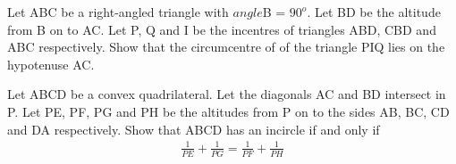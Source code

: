 \item Let ABC be a right-angled triangle with $angle$B = $90^{o}$. Let BD be the altitude from B on to AC. Let P, Q and I be the incentres of triangles ABD, CBD and ABC respectively. Show that the circumcentre of of the triangle PIQ lies on the hypotenuse AC.

\item Let ABCD be a convex quadrilateral. Let the diagonals AC and BD intersect in P. Let PE, PF, PG and PH be the altitudes from P on to the sides AB, BC, CD and DA respectively. Show that ABCD has an incircle if and only if
\begin{align*}
\frac{1}{PE} + \frac{1}{PG} = \frac{1}{PF} + \frac{1}{PH}
\end{align*}
























